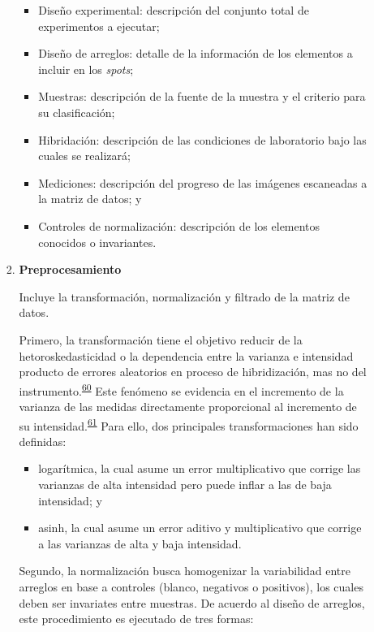 \documentclass[]{article}
\providecommand{\tightlist}{%
  \setlength{\itemsep}{0pt}\setlength{\parskip}{0pt}}
\begin{document}
\begin{enumerate}
\begin{enumerate}
\begin{enumerate}
      \begin{itemize}
      \tightlist
      \item
        Diseño experimental: descripción del conjunto total de
        experimentos a ejecutar;
      \item
        Diseño de arreglos: detalle de la información de los elementos a
        incluir en los \emph{spots};
      \item
        Muestras: descripción de la fuente de la muestra y el criterio
        para su clasificación;
      \item
        Hibridación: descripción de las condiciones de laboratorio bajo
        las cuales se realizará;
      \item
        Mediciones: descripción del progreso de las imágenes escaneadas
        a la matriz de datos; y
      \item
        Controles de normalización: descripción de los elementos
        conocidos o invariantes.
      \end{itemize}
    \item
      \textbf{Preprocesamiento}

      Incluye la transformación, normalización y filtrado de la matriz
      de datos.

      Primero, la transformación tiene el objetivo reducir de la
      hetoroskedasticidad o la dependencia entre la varianza e
      intensidad producto de errores aleatorios en proceso de
      hibridización, mas no del
      instrumento.\textsuperscript{\protect\hyperlink{ref-kreil2005bullet}{60}}
      Este fenómeno se evidencia en el incremento de la varianza de las
      medidas directamente proporcional al incremento de su
      intensidad.\textsuperscript{\protect\hyperlink{ref-brown2001image}{61}}
      Para ello, dos principales transformaciones han sido definidas:

      \begin{itemize}
      \tightlist
      \item
        logarítmica, la cual asume un error multiplicativo que corrige
        las varianzas de alta intensidad pero puede inflar a las de baja
        intensidad; y
      \item
        asinh, la cual asume un error aditivo y multiplicativo que
        corrige a las varianzas de alta y baja intensidad.
      \end{itemize}

      Segundo, la normalización busca homogenizar la variabilidad entre
      arreglos en base a controles (blanco, negativos o positivos), los
      cuales deben ser invariates entre muestras. De acuerdo al diseño
      de arreglos, este procedimiento es ejecutado de tres formas:


\end{enumerate}
\end{enumerate}
\end{enumerate}
\end{document}
